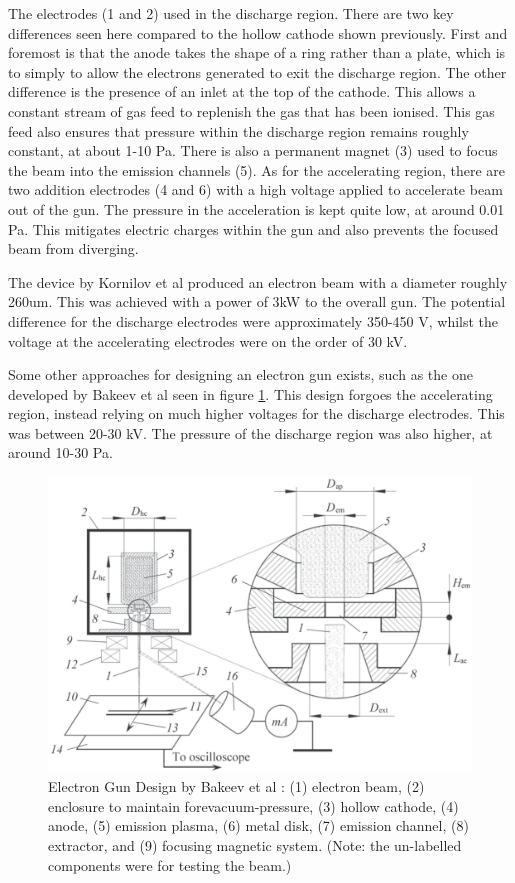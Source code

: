 The electrodes (1 and 2) used in the discharge region. There are two key differences seen here compared to the hollow cathode shown previously. First and foremost is that the anode takes the shape of a ring rather than a plate, which is to simply to allow the electrons generated to exit the discharge region. The other difference is the presence of an inlet at the top of the cathode. This allows a constant stream of gas feed to replenish the gas that has been ionised. This gas feed also ensures that pressure within the discharge region remains roughly constant, at about 1-10 Pa. There is also a permanent magnet (3) used to focus the beam into the emission channels (5). As for the accelerating region, there are two addition electrodes (4 and 6) with a high voltage applied to accelerate beam out of the gun. The pressure in the acceleration is kept quite low, at around 0.01 Pa. This mitigates electric charges within the gun and also prevents the focused beam from diverging. 

The device by Kornilov et al produced an electron beam with a diameter roughly 260um. This was achieved with a power of 3kW to the overall gun. The potential difference for the discharge electrodes were approximately 350-450 V, whilst the voltage at the accelerating electrodes were on the order of 30 kV. 

Some other approaches for designing an electron gun exists, such as the one developed by Bakeev et al \cite{YuBakeev2018} seen in figure \ref{fig:bakeev_device}. This design forgoes the accelerating region, instead relying on much higher voltages for the discharge electrodes. This was between 20-30 kV. The pressure of the discharge region was also higher, at around 10-30 Pa.

\begin{figure}[h!]
	\centering
	\includegraphics[width=0.6\linewidth]{background/figures/bakeev_device.png}
	\caption{Electron Gun Design by Bakeev et al \cite{YuBakeev2018}: (1) electron beam, (2) enclosure to maintain forevacuum-pressure, (3) hollow cathode, (4) anode, (5) emission plasma, (6) metal disk, (7) emission channel, (8) extractor, and (9) focusing magnetic system. (Note: the un-labelled components were for testing the beam.)}
	\label{fig:bakeev_device}
\end{figure}

